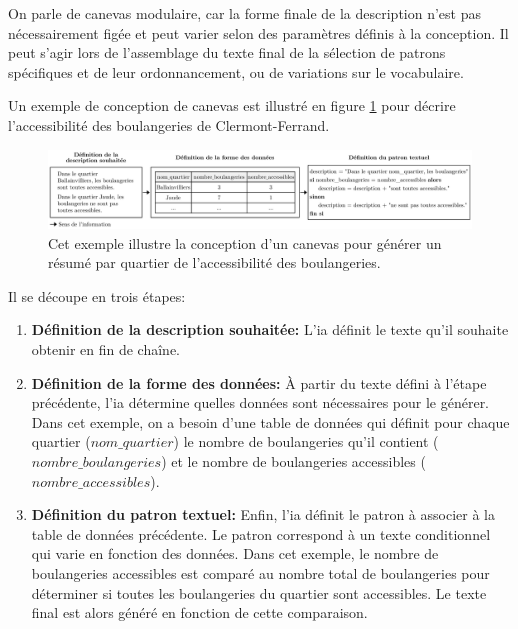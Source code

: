 \newpar{}

On parle de canevas modulaire, car la forme finale de la description n’est pas nécessairement figée et peut varier selon des paramètres définis à la conception. Il peut s’agir lors de l’assemblage du texte final de la sélection de patrons spécifiques et de leur ordonnancement, ou de variations sur le vocabulaire.

\newpar{}

Un exemple de conception de canevas est illustré en figure \ref{fig:desc_canevas_modulaire} pour décrire l'accessibilité des boulangeries de Clermont-Ferrand. 

\begin{figure}[ht]
    \centering
    \includegraphics[width=\textwidth]{images/description/exemple_canevas.pdf}
    \caption[Exemple de canevas de description]{Cet exemple illustre la conception d'un canevas pour générer un résumé par quartier de l'accessibilité des boulangeries.}
    \label{fig:desc_canevas_modulaire}
\end{figure}

Il se découpe en trois étapes:

\begin{enumerate}
    \item \textbf{Définition de la description souhaitée:} L'\gls{ia} définit le texte qu'il souhaite obtenir en fin de chaîne.
    \item \textbf{Définition de la forme des données:} À partir du texte défini à l'étape précédente, l'\gls{ia} détermine quelles données sont nécessaires pour le générer. Dans cet exemple, on a besoin d'une table de données qui définit pour chaque quartier ($nom\_quartier$) le nombre de boulangeries qu'il contient ($nombre\_boulangeries$) et le nombre de boulangeries accessibles ($nombre\_accessibles$). 
    \item \textbf{Définition du patron textuel:} Enfin, l'\gls{ia} définit le patron à associer à la table de données précédente. Le patron correspond à un texte conditionnel qui varie en fonction des données. Dans cet exemple, le nombre de boulangeries accessibles est comparé au nombre total de boulangeries pour déterminer si toutes les boulangeries du quartier sont accessibles. Le texte final est alors généré en fonction de cette comparaison. 
\end{enumerate}

